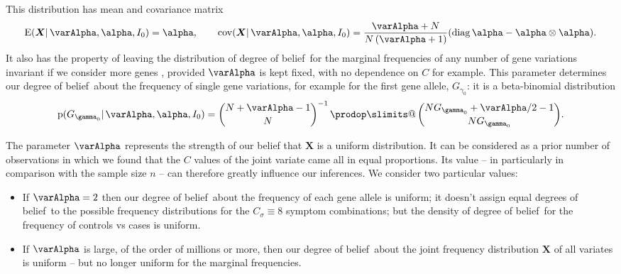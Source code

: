 \documentclass[\ifafour a4paper,12pt,\else a5paper,10pt,\fi%
onecolumn,oneside,article,%
british%
]{memoir}
\makeatletter
\theoremstyle{remark}
\theoremstyle{innote}
\def\sum{\DOTSI\sumop\slimits@}
\def\prod{\DOTSI\prodop\slimits@}
\newcommand*{\citep}{\parencites}
\newcommand*{\delt}{\deltaup}%
\newcommand*{\di}{\mathrm{d}}%
\newcommand*{\pf}{\mathrm{p}}%
\renewcommand*{\|}{\mathpunct{|}}
\newcommand*{\sects}{\S\S}%
\newcommand*{\tprod}{\mathop{\textstyle\prod}\nolimits}
\newcommand*{\tsum}{\mathop{\textstyle\sum}\nolimits}
\newcommand*{\E}{\mathrm{E}}
\DeclareMathOperator{\cov}{cov}
\DeclareMathOperator{\diag}{diag}
\newcommand*{\dob}{degree of belief}
\newcommand*{\dobs}{degrees of belief}
\newcommand*{\ysum}{\tsum}
\newcommand*{\yprod}{\tprod}
\newcommand*{\yg}{\gamma}
\newcommand*{\yFs}{\bm{S}}
\newcommand*{\yF}{\bm{X}}
\newcommand*{\yCs}{C_{\sigma}}
\newcommand*{\yIo}{I_{0}}
\newcommand*{\yA}{\varAlpha}
\newcommand*{\ya}{\bm{\alpha}}
\makeatother
\begin{document}
This distribution has mean and covariance matrix
\begin{equation}\label{eq:NO-mean_covariance_dirichlet}
  \E(\yF \| \yA, \ya,\yIo) = \ya, \qquad
  \cov(\yF \| \yA, \ya,\yIo) =
  \frac{\yA+N}{N\,(\yA+1)}(\diag\ya -\ya\otimes\ya).
\end{equation}
It also has the property of leaving the distribution of \dob\ for the
marginal frequencies of any number of gene variations invariant if we
consider more genes \citep[\sects~3--4]{basuetal1982}, provided $\yA$ is
kept fixed, with no dependence on $C$ for example. This parameter
determines our \dob\ about the frequency of single gene variations, for
example for the first gene allele, $G_{\yg_0}$: it is a beta-binomial
distribution
\begin{equation}
  \label{eq:NO-dirichlet_prior_marginal_beta-binomial}
  \pf(G_{\yg_0} \| \yA, \ya,\yIo) =
  \binom{N+\yA-1}{N}^{-1} \yprod\binom{N G_{\yg_0}+\yA/2-1}{N G_{\yg_0}}.
\end{equation}

The parameter $\yA$ represents the strength of our belief that $\yF$ is a
uniform distribution. It can be considered as a prior number of
observations in which we found that the $C$ values of the joint variate
came all in equal proportions. Its value -- in particularly in comparison
with the sample size $n$ -- can therefore greatly influence
our inferences. We consider two particular values:
\begin{itemize}[label=--]
\item If $\yA=2$ then our \dob\ about the frequency of each gene allele is
  uniform; it doesn't assign equal \dobs\ to the possible frequency
  distributions for the $\yCs\equiv 8$ symptom combinations; %
  but the density of \dob\ for the frequency of controls vs cases is
  uniform.
\item If $\yA$ is large, of the order of millions or more, then our \dob\
  about the joint frequency distribution $\yF$ of all variates is uniform
  -- but no longer uniform for the marginal frequencies.
\end{itemize}
\end{document}
